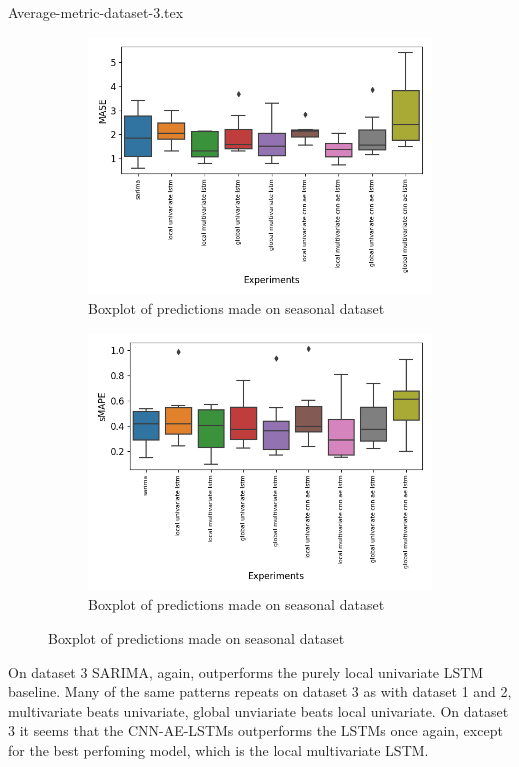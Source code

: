 \begin{samepage}
  {Average-metric-dataset-3.tex}
  \begin{figure}[h!]
    \centering
    \begin{subfigure}[b]{0.49\textwidth}
      \includegraphics[width=\textwidth]{./figs/results/boxplot/mase-dataset_3.png}
      \hfill
      \caption{Boxplot of predictions made on seasonal dataset}
      \label{fig:results:boxplot-mase-dataset-3}

    \end{subfigure}
    \begin{subfigure}[b]{0.49\textwidth}
      \includegraphics[width=\textwidth]{./figs/results/boxplot/smape-dataset_3.png}
      \hfill
      \caption{Boxplot of predictions made on seasonal dataset}
      \label{fig:results:boxplot-smape-dataset-3}
    \end{subfigure}
  \end{figure}
\end{samepage}
On dataset 3 SARIMA, again, outperforms the purely local univariate LSTM baseline.
Many of the same patterns repeats on dataset 3 as with dataset 1 and 2, multivariate beats univariate,
global unviariate beats local univariate.
On dataset 3 it seems that the CNN-AE-LSTMs outperforms the LSTMs once again, except for the
best perfoming model, which is the local multivariate LSTM.


